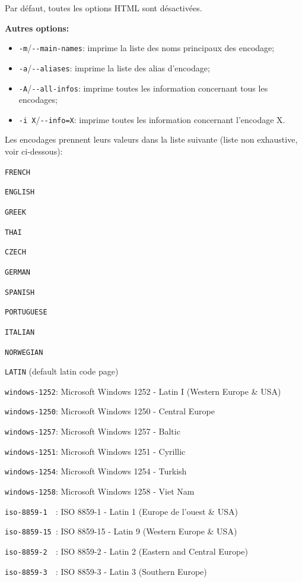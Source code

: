 \noindent Par défaut, toutes les options HTML sont désactivées.

\bigskip
\noindent \textbf{Autres options:}
\begin{itemize}
\item \verb+-m+/\verb+--main-names+: imprime la liste des noms principaux des encodage;
\item \verb+-a+/\verb+--aliases+: imprime la liste des alias d'encodage;
\item \verb+-A+/\verb+--all-infos+: imprime toutes les information concernant tous les encodages;
\item \verb+-i X+/\verb+--info=X+: imprime toutes les information concernant l'encodage X.
\end{itemize}

\bigskip
\noindent Les encodages prennent leurs valeurs dans la liste suivante  (liste non exhaustive, voir
	ci-dessous):

\bigskip
\verb$FRENCH$

\verb$ENGLISH$

\verb$GREEK$

\verb$THAI$

\verb$CZECH$

\verb$GERMAN$

\verb$SPANISH$

\verb$PORTUGUESE$

\verb$ITALIAN$

\verb$NORWEGIAN$

\verb$LATIN$ (default latin code page)

\verb$windows-1252$: Microsoft Windows 1252 - Latin I (Western Europe \& USA)

\verb$windows-1250$: Microsoft Windows 1250 - Central Europe

\verb$windows-1257$: Microsoft Windows 1257 - Baltic

\verb$windows-1251$: Microsoft Windows 1251 - Cyrillic

\verb$windows-1254$: Microsoft Windows 1254 - Turkish

\verb$windows-1258$: Microsoft Windows 1258 - Viet Nam

\verb$iso-8859-1  $: ISO 8859-1  - Latin 1 (Europe de l'ouest \& USA)

\verb$iso-8859-15 $: ISO 8859-15 - Latin 9 (Western Europe \& USA)

\verb$iso-8859-2  $: ISO 8859-2  - Latin 2 (Eastern and Central Europe)

\verb$iso-8859-3  $: ISO 8859-3  - Latin 3 (Southern Europe)

